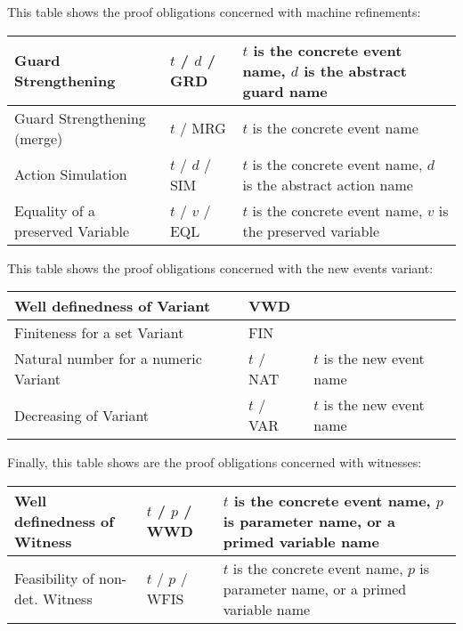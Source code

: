 This table shows the proof obligations concerned with machine refinements:

\begin{center}
    \begin{tabular}{| p{6cm} | p{3cm} | p{5cm} |}
    \hline
	Guard Strengthening & $t$  / $d$  / GRD & $t$ is the concrete event name, $d$ is the abstract guard name\\ \hline
	Guard Strengthening (merge) & $t$  / MRG & $t$ is the concrete event name \\ \hline
	Action Simulation & $t$  / $d$  / SIM & $t$ is the concrete event name, $d$ is the abstract action name  \\ \hline
	Equality of a preserved Variable & $t$  / $v$  / EQL & $t$ is the concrete event name, $v$ is the preserved variable  \\ \hline
    \end{tabular}
\end{center}

This table shows the proof obligations concerned with the new events variant:

\begin{center}
    \begin{tabular}{| p{6cm} | p{3cm} | p{5cm} |}
    \hline
	Well definedness of Variant & VWD & \\ \hline
	Finiteness for a set Variant & FIN &  \\ \hline
	Natural number for a numeric Variant & $t$  / NAT & $t$ is the new event name \\ \hline
	Decreasing of Variant & $t$  / VAR & $t$ is the new event name  \\ \hline
    \end{tabular}
\end{center}

Finally, this table shows are the proof obligations concerned with witnesses:

\begin{center}
    \begin{tabular}{| p{6cm} | p{3cm} | p{5cm} |}
    \hline
	Well definedness of Witness & $t$  / $p$  / WWD & $t$ is the concrete event name, $p$ is parameter name, or a primed variable name \\ \hline
	Feasibility of non-det. Witness & $t$  / $p$  / WFIS & $t$ is the concrete event name, $p$ is parameter name, or a primed variable name \\ \hline
    \end{tabular}
\end{center}

